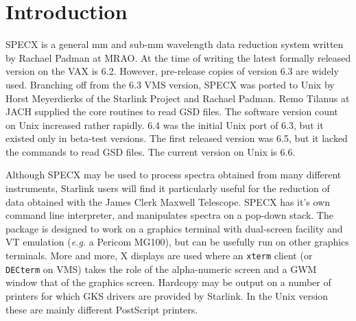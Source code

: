\newpage

\section {Introduction}

SPECX is a general mm and sub-mm wavelength data reduction system
written by Rachael Padman at MRAO. At the time of writing the latest
formally released version on the VAX is 6.2. However, pre-release copies
of version 6.3 are widely used. Branching off from the 6.3 VMS version,
SPECX was ported to Unix by Horst Meyerdierks of the Starlink Project
and Rachael Padman. Remo Tilanus at JACH supplied the core routines to
read GSD files. The software version count on Unix increased rather
rapidly. 6.4 was the initial Unix port of 6.3, but it existed only in
beta-test versions. The first released version was 6.5, but it lacked
the commands to read GSD files. The current version on Unix is 6.6.

Although SPECX may be used to process spectra obtained from many
different instruments, Starlink users will find it particularly useful
for the reduction of data obtained with the James Clerk Maxwell
Telescope.  SPECX has it's own command line interpreter, and manipulates
spectra on a pop-down stack.  The package is designed to work on a
graphics terminal with dual-screen facility and VT emulation ({\em e.g.}
a Pericom MG100), but can be usefully run on other graphics terminals.
More and more, X displays are used where an {\tt xterm} client (or {\tt
DECterm} on VMS) takes the role of the alpha-numeric screen and a GWM
window that of the graphics screen.  Hardcopy may be output on a number
of printers for which GKS drivers are provided by Starlink. In the Unix
version these are mainly different PostScript printers.

